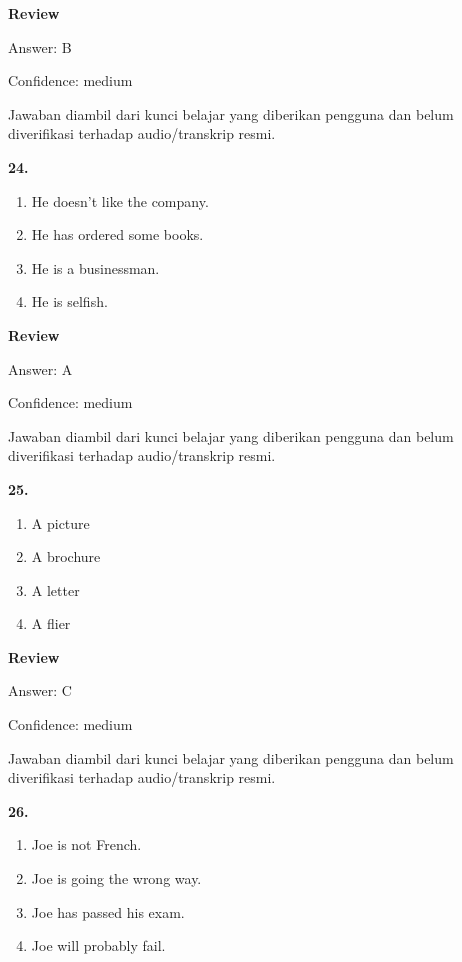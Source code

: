 \documentclass[12pt]{article}
\begin{document}
\begingroup
\setlength{\parskip}{0pt}
\setlength{\parindent}{0pt}
\textbf{Review}\par
Answer: B\par
Confidence: medium\par
Jawaban diambil dari kunci belajar yang diberikan pengguna dan belum diverifikasi terhadap audio/transkrip resmi.\par
\endgroup
\par
\vspace{0.25\baselineskip}
\noindent\textbf{24.}
\begin{enumerate}[label=(\Alph*),leftmargin=*,itemsep=0.2em]
\item He doesn't like the company.
\item He has ordered some books.
\item He is a businessman.
\item He is selfish.
\end{enumerate}
\par
\begingroup
\setlength{\parskip}{0pt}
\setlength{\parindent}{0pt}
\textbf{Review}\par
Answer: A\par
Confidence: medium\par
Jawaban diambil dari kunci belajar yang diberikan pengguna dan belum diverifikasi terhadap audio/transkrip resmi.\par
\endgroup
\par
\vspace{0.25\baselineskip}
\noindent\textbf{25.}
\begin{enumerate}[label=(\Alph*),leftmargin=*,itemsep=0.2em]
\item A picture
\item A brochure
\item A letter
\item A flier
\end{enumerate}
\par
\begingroup
\setlength{\parskip}{0pt}
\setlength{\parindent}{0pt}
\textbf{Review}\par
Answer: C\par
Confidence: medium\par
Jawaban diambil dari kunci belajar yang diberikan pengguna dan belum diverifikasi terhadap audio/transkrip resmi.\par
\endgroup
\par
\vspace{0.25\baselineskip}
\noindent\textbf{26.}
\begin{enumerate}[label=(\Alph*),leftmargin=*,itemsep=0.2em]
\item Joe is not French.
\item Joe is going the wrong way.
\item Joe has passed his exam.
\item Joe will probably fail.
\end{enumerate}
\end{document}
